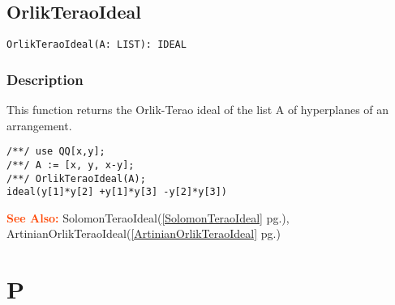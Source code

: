 \documentclass[a4paper]{mybook}
\newenvironment{command}{}{} %
\newcommand\SeeAlso{\par\textcolor{OrangeRed}{\textbf{\large See Also: }}}
\begin{document}
\section{OrlikTeraoIdeal}
\label{OrlikTeraoIdeal}
\begin{command} %


\begin{Verbatim}[label=syntax, rulecolor=\color{MidnightBlue},
frame=single]
OrlikTeraoIdeal(A: LIST): IDEAL 
\end{Verbatim}


\subsection*{Description}

This function returns the Orlik-Terao ideal of the list A of hyperplanes of an arrangement.
\begin{Verbatim}[label=example, rulecolor=\color{PineGreen}, frame=single]
/**/ use QQ[x,y];	
/**/ A := [x, y, x-y];
/**/ OrlikTeraoIdeal(A);
ideal(y[1]*y[2] +y[1]*y[3] -y[2]*y[3])
\end{Verbatim}


\SeeAlso %
  SolomonTeraoIdeal(\ref{SolomonTeraoIdeal} pg.\pageref{SolomonTeraoIdeal}), 
    ArtinianOrlikTeraoIdeal(\ref{ArtinianOrlikTeraoIdeal} pg.\pageref{ArtinianOrlikTeraoIdeal})
\end{command} %

\chapter{P}  %
\label{P}
\end{document}
